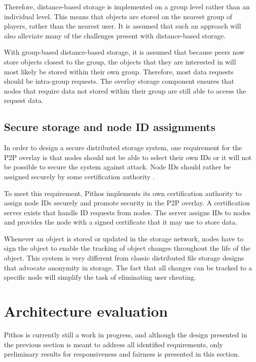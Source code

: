 \documentclass[10pt,a4paper,conference]{IEEEtran}
\begin{document}
Therefore, distance-based storage is implemented on a group level rather than an individual level. This means that objects are stored on the nearest
group of players, rather than the nearest user. It is assumed that such an approach will also alleviate many of the challenges present with
distance-based storage.

With group-based distance-based storage, it is assumed that because peers now store objects closest to the group, the objects that they are
interested in will most likely be stored within their own group. Therefore, most data requests should be intra-group requests. The overlay storage
component ensures that nodes that require data not stored within their group are still able to access the request data.

\subsection{Secure storage and node ID assignments}
\label{secure_ids}

In order to design a secure distributed storage system, one requirement for the P2P overlay is that nodes should not be able to select their own IDs
or it will not be possible to secure the system against attack. Node IDs should rather be assigned securely by some certification authority
\cite{secure_overlay_routing}.

To meet this requirement, Pithos implements its own certification authority to assign node IDs securely and promote security in the P2P overlay. A
certification server exists that handle ID requests from nodes. The server assigns IDs to nodes and provides the node with a signed certificate that
it may use to store data.

Whenever an object is stored or updated in the storage network, nodes have to sign the object to enable the tracking of object changes throughout the
life of the object. This system is very different from classic distributed file storage designs that advocate anonymity in storage. The fact that all
changes can be tracked to a specific node will simplify the task of eliminating user cheating.

\section{Architecture evaluation}
\label{evaluation}

Pithos is currently still a work in progress, and although the design presented in the previous section is meant to address all identified
requirements, only preliminary results for responsiveness and fairness is presented in this section.
\end{document}
